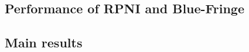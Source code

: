 \subsection{Performance of RPNI and Blue-Fringe\label{subsection_stamina_baseline}}



\subsection{Main results\label{subsection_stamina_results}}




